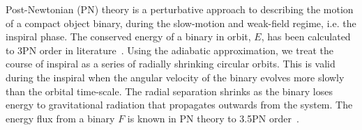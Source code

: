 

Post-Newtonian (PN) theory is a perturbative approach to describing the
motion of a compact object binary, during the slow-motion and weak-field 
regime, i.e. the inspiral phase. The conserved energy of a binary in orbit,
$E$, has been calculated to 3PN order in literature~\citep{Jaranowski:1997ky,
Jaranowski:1999ye,Jaranowski:1999qd,Damour:2001bu,Blanchet:2003gy,
Damour:2000ni,Blanchet:2002mb}.
Using the adiabatic approximation, we treat the course of inspiral as a series
of radially shrinking circular orbits. This is valid during the inspiral when
the angular velocity of the binary evolves more slowly than the orbital 
time-scale. The radial separation shrinks as the binary loses energy to 
gravitational radiation that propagates outwards from the system. 
The energy flux from a binary $F$ is known in PN theory to 3.5PN 
order~\cite{FluxandE3-5PN,Blanchet:2004ek,Blanchet:2005tk,Blanchet:2004bb}.
